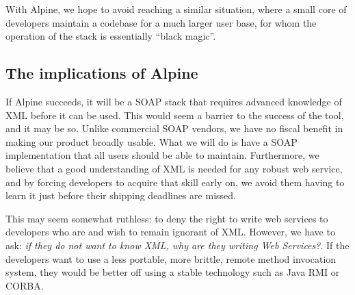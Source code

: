 With Alpine, we hope to avoid reaching a similar situation, where a
small core of developers maintain a codebase for a much larger user
base, for whom the operation of the stack is essentially ``black
magic''. 

\subsection{The implications of Alpine}

If Alpine succeeds, it will be a SOAP stack that requires advanced knowledge of
XML before it can be used. This would seem a barrier to the success of
the tool, and it may be so. Unlike commercial SOAP vendors, we have no
fiscal benefit in making our product broadly usable. What we will do is
have a SOAP implementation that all users should be able to maintain.
Furthermore, we believe that a good understanding of XML is needed for
any robust web service, and by forcing developers to acquire that skill
early on, we avoid them having to learn it just before their shipping deadlines
are missed. 

This may seem somewhat ruthless: to deny the right to write web
services to developers who are and wish to remain ignorant of XML.
However, we have to ask: \emph{if they do not want to know XML, why are
they writing Web Services?}. If the developers want to use a less portable,
more brittle, remote method invocation system, they would be better off
using a stable technology such as Java RMI or CORBA.
